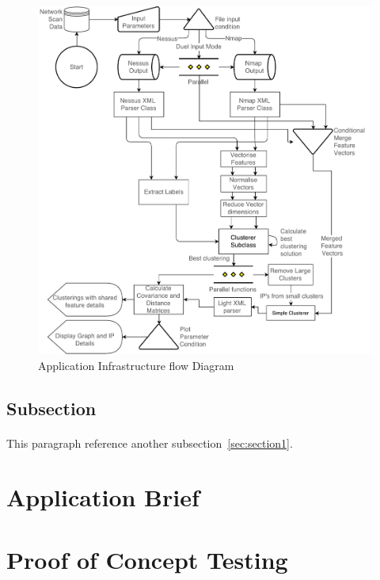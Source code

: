 \begin{figure}[!t]
\centering
\includegraphics[width=5.5in]{./Figures/flow.pdf}
\caption{Application Infrastructure flow Diagram}
\label{flow}
\end{figure}

\subsection{Subsection}
\label{ssec:subsection2}

\paragraph{}This paragraph reference another subsection~\ref{sec:section1}.

\section{Application Brief}
\label{sec:section3}

\section{Proof of Concept Testing}
\label{sec:section4}


